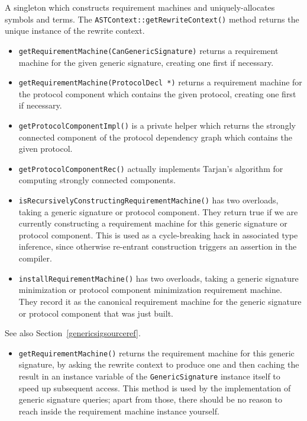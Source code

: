 \documentclass[../generics]{subfiles}
\begin{document}
A singleton which constructs requirement machines and uniquely-allocates symbols and terms. The \texttt{ASTContext::getRewriteContext()} method returns the unique instance of the rewrite context.
\begin{itemize}
\item \texttt{getRequirementMachine(CanGenericSignature)} returns a requirement machine for the given generic signature, creating one first if necessary.
\item \texttt{getRequirementMachine(ProtocolDecl *)} returns a requirement machine for the protocol component which contains the given protocol, creating one first if necessary.
\item \texttt{getProtocolComponentImpl()} is a private helper which returns the strongly connected component of the protocol dependency graph which contains the given protocol.
\item \texttt{getProtocolComponentRec()} actually implements Tarjan's algorithm for computing strongly connected components.
\item \texttt{isRecursivelyConstructingRequirementMachine()} has two overloads, taking a generic signature or protocol component. They return true if we are currently constructing a requirement machine for this generic signature or protocol component. This is used as a cycle-breaking hack in associated type inference, since otherwise re-entrant construction triggers an assertion in the compiler.
\item \texttt{installRequirementMachine()} has two overloads, taking a generic signature minimization or  protocol component minimization requirement machine. They record it as the canonical requirement machine for the generic signature or protocol component that was just built.
\end{itemize}

See also Section~\ref{genericsigsourceref}.
\begin{itemize}
\item \texttt{getRequirementMachine()} returns the requirement machine for this generic signature, by asking the rewrite context to produce one and then caching the result in an instance variable of the \texttt{GenericSignature} instance itself to speed up subsequent access. This method is used by the implementation of generic signature queries; apart from those, there should be no reason to reach inside the requirement machine instance yourself.
\end{itemize}
\end{document}

